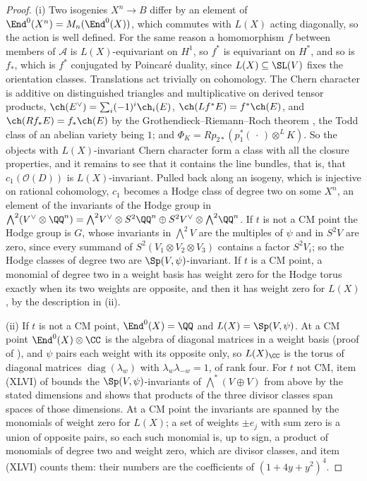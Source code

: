 \begin{proof}
(i) Two isogenies $X^{n}\to B$ differ by an element of $\End^{0}(X^{n})=
M_{n}(\End^{0}(X))$, which commutes with $L(X)$ acting diagonally, so the
action is well defined. For the same reason a homomorphism $f$ between members
of $\mathcal{A}$ is $L(X)$-equivariant on $H^{1}$, so $f^{*}$ is equivariant
on $H^{*}$, and so is $f_{*}$, which is $f^{*}$ conjugated by Poincar\'e
duality, since $L(X)\subseteq\SL(V)$ fixes the orientation classes.
Translations act trivially on cohomology. The Chern character is additive on
distinguished triangles and multiplicative on derived tensor products,
$\ch(E^{\vee})=\sum_{i}(-1)^{i}\ch_{i}(E)$, $\ch(Lf^{*}E)=f^{*}\ch(E)$, and
$\ch(Rf_{*}E)=f_{*}\ch(E)$ by the Grothendieck--Riemann--Roch theorem
\cite[Theorem~15.2]{Ful98}, the Todd class of an abelian variety being $1$;
and $\Phi_{K}=Rp_{2*}(p_{1}^{*}(\,\cdot\,)\otimes^{L}K)$. So the objects with
$L(X)$-invariant Chern character form a class with all the closure
properties, and it remains to see that it contains the line bundles, that is,
that $c_{1}(\mathcal{O}(D))$ is $L(X)$-invariant. Pulled back along an
isogeny, which is injective on rational cohomology, $c_{1}$ becomes a Hodge
class of degree two on some $X^{n}$, an element of the invariants of the
Hodge group in ${\textstyle\bigwedge^{2}}(V^{\vee}\otimes\QQ^{n})=
{\textstyle\bigwedge^{2}}V^{\vee}\otimes S^{2}\QQ^{n}\oplus S^{2}V^{\vee}
\otimes{\textstyle\bigwedge^{2}}\QQ^{n}$. If $t$ is not a CM point the Hodge
group is $G$, whose invariants in ${\textstyle\bigwedge^{2}}V$ are the multiples of $\psi$
and in $S^{2}V$ are zero, since every summand of $S^{2}(V_{1}\otimes V_{2}
\otimes V_{3})$ contains a factor $S^{2}V_{i}$; so the Hodge classes of degree
two are $\Sp(V,\psi)$-invariant. If $t$ is a CM point, a monomial of degree two
in a weight basis has weight zero for the Hodge torus exactly when its two
weights are opposite, and then it has weight zero for $L(X)$, by the
description in (ii).

(ii) If $t$ is not a CM point, $\End^{0}(X)=\QQ$ and $L(X)=\Sp(V,\psi)$. At a
CM point $\End^{0}(X)\otimes\CC$ is the algebra of diagonal matrices in a
weight basis (proof of ), and $\psi$ pairs each weight
with its opposite only, so $L(X)_{\CC}$ is the torus of diagonal matrices
$\operatorname{diag}(\lambda_{w})$ with $\lambda_{w}\lambda_{-w}=1$, of rank
four. For $t$ not CM, item (XLVI) of  bounds the
$\Sp(V,\psi)$-invariants of ${\textstyle\bigwedge^{*}}(V\oplus V)$ from above by the stated
dimensions and shows that products of the three divisor classes span spaces
of those dimensions. At a CM point the invariants are spanned by the
monomials of weight zero for $L(X)$; a set of weights $\pm e_{j}$ with sum
zero is a union of opposite pairs, so each such monomial is, up to sign, a
product of monomials of degree two and weight zero, which are divisor
classes, and item (XLVI) counts them: their numbers are the coefficients of
$(1+4y+y^{2})^{4}$.


\end{proof}
